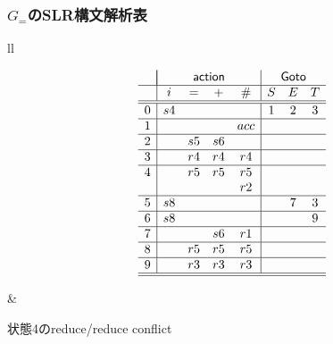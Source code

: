 \documentclass[dvipdfmx]{beamer}
\begin{document}
\begin{frame}
  \frametitle{$G_{=}$のSLR構文解析表}
  \begin{tabular}{ll}
    \begin{minipage}{.5\textwidth}
      \[
        \begin{array}{c|cccc|ccc}
            & \multicolumn{4}{|c}{\mathsf{action}}
            & \multicolumn{3}{|c}{\mathsf{Goto}}                               \\\hline
            & i                                    & =  & +  & \#  & S & E & T \\\hline\hline
          0 & s4                                   &    &    &     & 1 & 2 & 3 \\\hline
          1 &                                      &    &    & acc &   &   &   \\\hline
          2 &                                      & s5 & s6 &     &   &   &   \\\hline
          3 &                                      & r4 & r4 & r4  &   &   &   \\\hline
          4 &                                      & r5 & r5 & r5  &   &   &   \\
            &                                      &    &    & r2  &   &   &   \\\hline
          5 & s8                                   &    &    &     &   & 7 & 3 \\\hline
          6 & s8                                   &    &    &     &   &   & 9 \\\hline
          7 &                                      &    & s6 & r1  &   &   &   \\\hline
          8 &                                      & r5 & r5 & r5  &   &   &   \\\hline
          9 &                                      & r3 & r3 & r3  &   &   &   \\\hline\hline
        \end{array}
      \]
    \end{minipage}
     & {\small
        \begin{minipage}{.5\textwidth}
          状態4のreduce/reduce conflict\\[5pt]
          \\[3pt]

        \end{minipage}}
  \end{tabular}
\end{frame}
\end{document}
